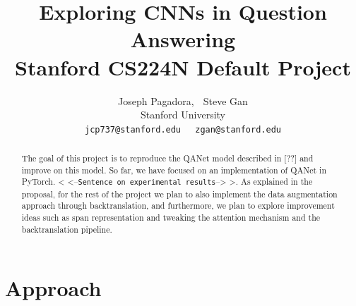 \documentclass{article}
\title{
  Exploring CNNs in Question Answering \\
  \vspace{1em}
  \small{\normalfont Stanford CS224N Default Project}  %
}
\author{
  Joseph Pagadora, $\;$ Steve Gan \\
  Stanford University \\
  \texttt{jcp737@stanford.edu}$\;\;\;\;$
  \texttt{zgan@stanford.edu} \\
}
\begin{document}
\maketitle


\begin{abstract}
The goal of this project is to reproduce the QANet model described in [??] and improve on this model. So far, we have focused on an implementation of QANet in PyTorch. < <--\texttt{Sentence on experimental results}--> >. As explained in the proposal, for the rest of the project we plan to also implement the data augmentation approach through backtranslation, and furthermore, we plan to explore improvement ideas such as span representation and tweaking the attention mechanism and the backtranslation pipeline.
\end{abstract}

\section{Approach}
\end{document}
